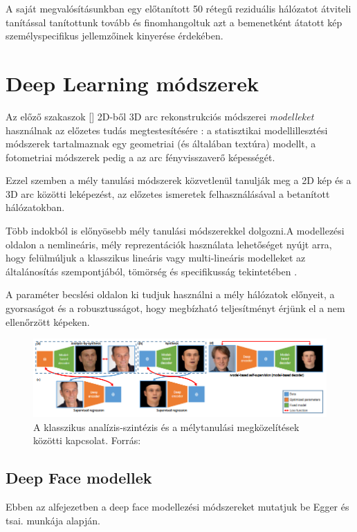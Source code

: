 \documentclass[12pt,a4]{article}
\begin{document}
    A saját megvalósításunkban egy előtanított 50 rétegű reziduális hálózatot átviteli tanítással tanítottunk tovább és finomhangoltuk azt a bemenetként átatott kép személyspecifikus jellemzőinek kinyerése érdekében.
    
    \section{Deep Learning módszerek}
	
	Az előző szakaszok [] 2D-ből 3D arc rekonstrukciós módszerei \textit{modelleket} használnak az előzetes tudás megtestesítésére \cite{survey}: a statisztikai modellillesztési módszerek tartalmaznak egy geometriai (és általában textúra) modellt, a fotometriai módszerek pedig a
	az arc fényvisszaverő képességét. 
	
	
	Ezzel szemben a mély tanulási módszerek
	közvetlenül tanulják meg a 2D kép és a 3D arc közötti leképezést, az előzetes ismeretek felhasználásával a betanított hálózatokban.
	
	
	Több indokból is előnyösebb mély tanulási módszerekkel dolgozni.\cite{3dmm}A modellezési oldalon a nemlineáris, mély reprezentációk használata lehetőséget nyújt arra, hogy felülmúljuk a klasszikus lineáris vagy multi-lineáris modelleket az általánosítás szempontjából, tömörség és specifikusság tekintetében \cite{styner}.
	
	
	A paraméter becslési oldalon ki tudjuk használni a mély hálózatok előnyeit, a gyorsaságot és a robusztusságot, hogy megbízható teljesítményt érjünk el a nem ellenőrzött képeken.
	
	\begin{figure}[h]	
		\centering
		\includegraphics[width=1\linewidth]{deep}
		\caption{A klasszikus analízis-szintézis és a mélytanulási megközelítések közötti kapcsolat. 
			Forrás:\cite{3dmm}}
	\end{figure}
	
	\newpage
	\subsection{Deep Face modellek}
    Ebben az alfejezetben a deep face modellezési módszereket mutatjuk be \cite{3dmm} Egger és tsai. munkája alapján. \\
 
\end{document}
